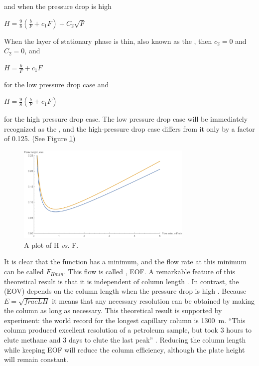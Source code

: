 and when the pressure drop is high

\(H = \frac{\displaystyle 9}{\displaystyle 8} \left(\frac{b}{F}+c_{1}F \right)+C_{2}\sqrt{F}\)

When the layer of stationary phase is thin, also known as the , then \(c_2 = 0\) and \(C_2 = 0\), and

\(H = \frac{\displaystyle b}{\displaystyle F} + c_{1} F \) 

for the low pressure drop case and 

\(H = \frac{\displaystyle 9}{\displaystyle 8} \left(\frac{b}{F}+c_{1}F \right)\)

for the high pressure drop case. The low pressure drop case will be immediately
recognized as the , and the high-pressure drop
case differs from it only by a factor of \num{0.125}. (See Figure
\ref{fig:VanDeemter})

\begin{figure}
\centering
\includegraphics[width=0.75\textwidth]{Figures/VanDeemter.pdf}
\decoRule
\caption[A plot of H \textit{vs.} F]{A plot of H \textit{vs.} F.}
\label{fig:VanDeemter}
\end{figure}

It is clear that the function has a minimum, and the flow rate at this minimum
can be called \(F_{Hmin}\). This flow is called , EOF. A remarkable feature of this theoretical result is that it is
independent of column length \autocite{Blumberg1999}. In contrast, the
 (EOV) depends on the column length when
the pressure drop is high \autocite{Blumberg1997}. Because \(E =
\sqrt{frac{L}{H}} \) it means that any necessary resolution can be obtained by
making the column as long as necessary. This theoretical result is supported by
experiment: the world record for the longest capillary column is
\SI{1300}{\metre}. ``This column produced excellent resolution of a petroleum
sample, but took 3 hours to elute methane and 3 days to elute the last peak''
\autocite{Ferguson2013}. Reducing the column length while keeping EOF will
reduce the column efficiency, although the plate height will remain constant.

